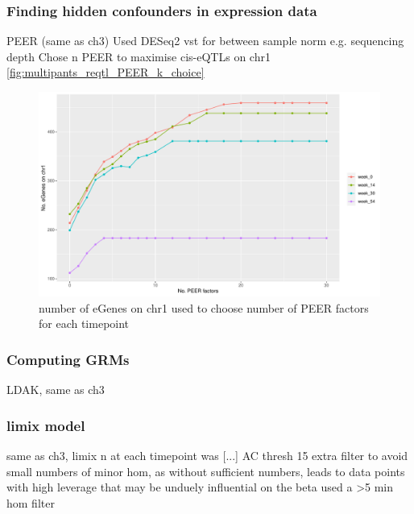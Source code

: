 \begin{outline}

\subsubsection{Finding hidden confounders in expression data}

\1 PEER (same as ch3)
    \2 Used DESeq2 vst for between sample norm e.g. sequencing depth 
    \2 Chose n PEER to maximise cis-eQTLs on chr1 \autoref{fig:multipants_reqtl_PEER_k_choice} 

\begin{figure}
    \centering
    \includegraphics[width=1.0\textwidth,page=1]{mainmatter/figures/chapter_04/count_eGenes.signif_eGenes_vs_PEER_n.dataset_multiPANTS.chr_1.pdf}
    \caption{number of eGenes on chr1 used to choose number of PEER factors for each timepoint}
    \label{fig:multipants_reqtl_PEER_k_choice}
\end{figure}

\subsubsection{Computing GRMs}

\1 LDAK, same as ch3

\subsubsection{limix model}

\1 same as ch3, limix
    \2 n at each timepoint was [...]
    \2 AC thresh 15
    \2 extra filter to avoid small numbers of minor hom, as without sufficient numbers, leads to data points with high leverage that may be unduely influential on the beta
    \2 used a >5 min hom filter


\end{outline}
